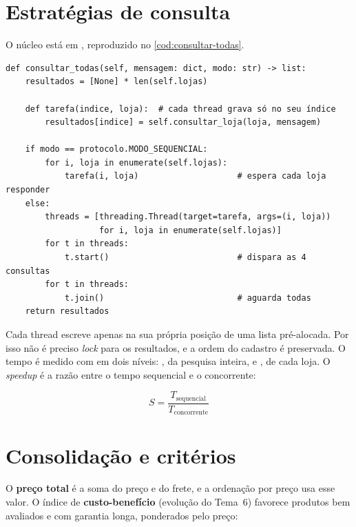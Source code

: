 \section{Estratégias de consulta}

O núcleo está em , reproduzido no \autoref{cod:consultar-todas}.

\begin{lstlisting}[float=!htbp, caption={Consulta às lojas nos modos sequencial e concorrente (\cod{agregador.py})}, label={cod:consultar-todas}]
def consultar_todas(self, mensagem: dict, modo: str) -> list:
    resultados = [None] * len(self.lojas)

    def tarefa(indice, loja):  # cada thread grava só no seu índice
        resultados[indice] = self.consultar_loja(loja, mensagem)

    if modo == protocolo.MODO_SEQUENCIAL:
        for i, loja in enumerate(self.lojas):
            tarefa(i, loja)                    # espera cada loja responder
    else:
        threads = [threading.Thread(target=tarefa, args=(i, loja))
                   for i, loja in enumerate(self.lojas)]
        for t in threads:
            t.start()                          # dispara as 4 consultas
        for t in threads:
            t.join()                           # aguarda todas
    return resultados
\end{lstlisting}

Cada thread escreve apenas na sua própria posição de uma lista pré-alocada. Por isso não é preciso \textit{lock} para os resultados, e a ordem do cadastro é preservada. O tempo é medido com  em dois níveis: , da pesquisa inteira, e , de cada loja. O \textit{speedup} é a razão entre o tempo sequencial e o concorrente:

\begin{equation}
  S = \frac{T_{\text{sequencial}}}{T_{\text{concorrente}}}
\end{equation}

\section{Consolidação e critérios}

O \textbf{preço total} é a soma do preço e do frete, e a ordenação por preço usa esse valor. O índice de \textbf{custo-benefício} (evolução do Tema~6) favorece produtos bem avaliados e com garantia longa, ponderados pelo preço:


